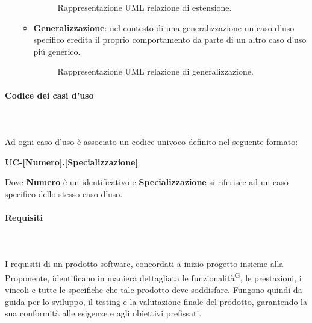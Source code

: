\documentclass[8pt]{article}
\newcommand{\glossterm}[1]{#1\textsuperscript{G}} %
\newcommand{\subsubsubsection}[1]{\paragraph{#1}\mbox{}\\}
\begin{document}
\begin{itemize}
\begin{itemize}
\begin{figure}[H]
                \caption{Rappresentazione UML relazione di estensione.}
                \label{fig:Rappresentazione UML relazione di estensione}
            \end{figure}
        \item \textbf{Generalizzazione}: nel contesto di una generalizzazione un caso d'uso specifico eredita il proprio comportamento da parte di un altro caso d'uso piú generico. 
            \begin{figure}[H]
                \centering
                \caption{Rappresentazione UML relazione di generalizzazione.}
                \label{fig:Rappresentazione UML relazione di generalizzazione}
            \end{figure}
        \end{itemize}
\end{itemize}
\subsubsubsection{Codice dei casi d'uso}\\
Ad ogni caso d'uso è associato un codice univoco definito nel seguente formato:
\begin{center}
    \textbf{UC-[Numero].[Specializzazione]}
\end{center}
Dove \textbf{Numero} è un identificativo e \textbf{Specializzazione} si riferisce ad un caso specifico
dello stesso caso d'uso.
\clearpage
\subsubsubsection{Requisiti} \\
I requisiti di un prodotto software, concordati a inizio progetto insieme alla Proponente, identificano in maniera dettagliata le \glossterm{funzionalità}, le prestazioni, i vincoli e tutte le specifiche che tale prodotto deve soddisfare. Fungono quindi da guida per lo sviluppo, il testing e la valutazione finale del prodotto, garantendo la sua conformità alle esigenze e agli obiettivi prefissati.\\
\end{document}
